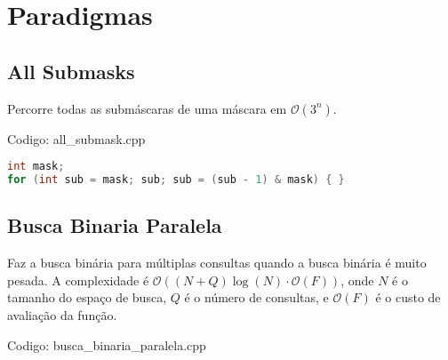 \documentclass[10pt, a4paper, oneside]{book}
\begin{document}
\newpage

%
%
%
%

\chapter{Paradigmas}

\section{All Submasks}


Percorre todas as submáscaras de uma máscara em $\mathcal{O}(3^n)$.

\hfill

Codigo: all\_submask.cpp

\begin{lstlisting}[language=C++]
int mask;
for (int sub = mask; sub; sub = (sub - 1) & mask) { }
\end{lstlisting}
\hfill

\section{Busca Binaria Paralela}


Faz a busca binária para múltiplas consultas quando a busca binária é muito pesada. A complexidade é $\mathcal{O}((N+Q) \log(N) \cdot \mathcal{O}(F))$, onde $N$ é o tamanho do espaço de busca, $Q$ é o número de consultas, e $\mathcal{O}(F)$ é o custo de avaliação da função.

\hfill

Codigo: busca\_binaria\_paralela.cpp
\end{document}
